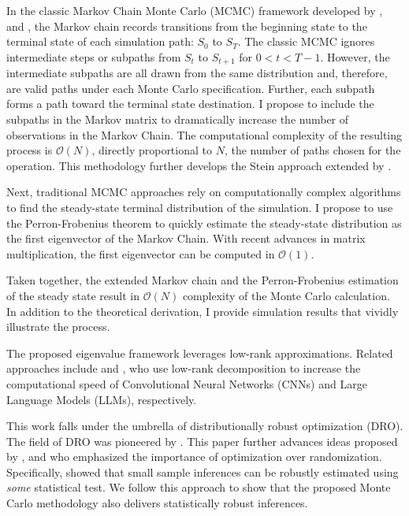 \documentclass{wscpaperproc}
\theoremstyle{wsc}
\begin{document}
In the classic Markov Chain Monte Carlo (MCMC) framework developed by ,  and , the Markov chain records transitions from the beginning state to the terminal state of each simulation path: $S_0$ to $S_T$. The classic MCMC ignores intermediate steps or subpaths from $S_t$ to $S_{t+1}$ for $0<t<T-1$.  However, the intermediate subpaths are all drawn from the same distribution and, therefore, are valid paths under each Monte Carlo specification. Further, each subpath forms a path toward the terminal state destination. I propose to include the subpaths in the Markov matrix to dramatically increase the number of observations in the Markov Chain. The computational complexity of the resulting process is $\mathcal{O}(N)$, directly proportional to $N$, the number of paths chosen for the operation. This methodology further develops the Stein approach extended by . 

Next, traditional MCMC approaches rely on computationally complex algorithms to find the steady-state terminal distribution of the simulation.  I propose to use the Perron-Frobenius theorem to quickly estimate the steady-state distribution as the first eigenvector of the Markov Chain. With recent advances in matrix multiplication, the first eigenvector can be computed in $\mathcal{O}(1)$. 

Taken together, the extended Markov chain and the Perron-Frobenius estimation of the steady state result in $\mathcal{O}(N)$ complexity of the Monte Carlo calculation. In addition to the theoretical derivation, I provide simulation results that vividly illustrate the process. 

The proposed eigenvalue framework leverages low-rank approximations. Related approaches include  and , who use low-rank decomposition to increase the computational speed of Convolutional Neural Networks (CNNs) and Large Language Models (LLMs), respectively.

This work falls under the umbrella of distributionally robust optimization (DRO). The field of DRO was pioneered by . This paper further advances ideas proposed by ,  and  who emphasized the importance of optimization over randomization. Specifically,  showed that small sample inferences can be robustly estimated using \textit{some} statistical test. We follow this approach to show that the proposed Monte Carlo methodology also delivers statistically robust inferences.  
\end{document}
